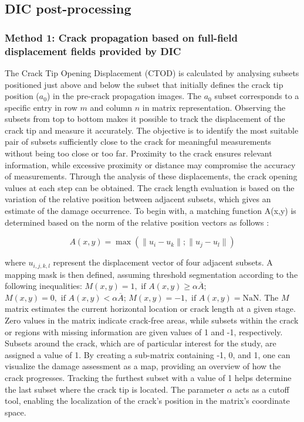\documentclass[3p,times,procedia]{elsarticle}
\begin{document}
\subsection{DIC post-processing}

\subsubsection{Method 1: Crack propagation based on full-field displacement fields provided by DIC}

The Crack Tip Opening Displacement (CTOD) is calculated by analysing subsets positioned just above and below the subset that initially defines the crack tip position ($a_0$) in the pre-crack propagation images. The $a_0$ subset corresponds to a specific entry in row $m$ and column $n$ in matrix representation. Observing the subsets from top to bottom makes it possible to track the displacement of the crack tip and measure it accurately. The objective is to identify the most suitable pair of subsets sufficiently close to the crack for meaningful measurements without being too close or too far. Proximity to the crack ensures relevant information, while excessive proximity or distance may compromise the accuracy of measurements. Through the analysis of these displacements, the crack opening values at each step can be obtained. The crack length evaluation is based on the variation of the relative position between adjacent subsets, which gives an estimate of the damage occurrence. To begin with, a matching function A(x,y) is determined based on the norm of the relative position vectors as follows \citep{Xavieretal2014}:

\vspace{0pt}
\begin{equation}
	A(x,y)=\max(\lVert u_i-u_k\rVert;\lVert u_j-u_l\rVert)
	\label{eq:eq21}
\end{equation}

\noindent where $u_{i,j,k,l}$ represent the displacement vector of four adjacent subsets. A mapping mask is then defined, assuming threshold segmentation according to the following inequalities: $M(x,y) = 1, \text{ if } A(x, y) \geq \alpha \overline{A}$; $M(x,y) = 0, \text{ if } A(x, y) < \alpha \overline{A}$; $M(x,y) = -1, \text{ if } A(x, y) = \text{NaN}$. The $M$ matrix estimates the current horizontal location or crack length at a given stage. Zero values in the matrix indicate crack-free areas, while subsets within the crack or regions with missing information are given values of 1 and -1, respectively. Subsets around the crack, which are of particular interest for the study, are assigned a value of 1. By creating a sub-matrix containing -1, 0, and 1, one can visualize the damage assessment as a map, providing an overview of how the crack progresses. Tracking the furthest subset with a value of 1 helps determine the last subset where the crack tip is located. The parameter $\alpha$ acts as a cutoff tool, enabling the localization of the crack's position in the matrix's coordinate space.
\end{document}

